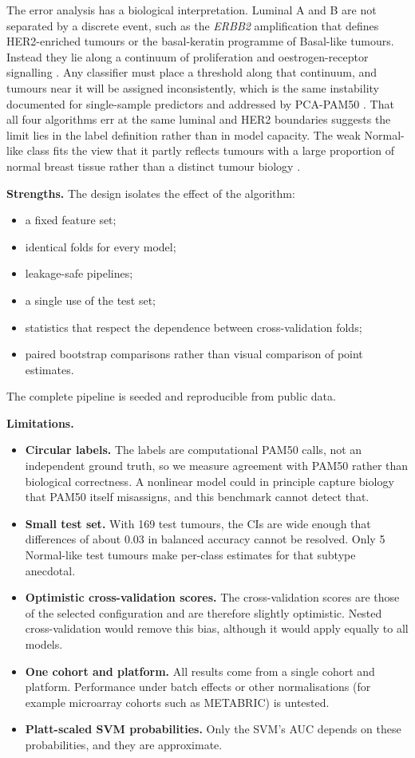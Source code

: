 \documentclass[10pt,twocolumn]{article}
\begin{document}
The error analysis has a biological interpretation. Luminal A and B are not separated by a discrete event, such as the \textit{ERBB2} amplification that defines HER2-enriched tumours or the basal-keratin programme of Basal-like tumours. Instead they lie along a continuum of proliferation and oestrogen-receptor signalling \citep{cheang2009,prat2011}. Any classifier must place a threshold along that continuum, and tumours near it will be assigned inconsistently, which is the same instability documented for single-sample predictors \citep{weigelt2010} and addressed by PCA-PAM50 \citep{paquet2019}. That all four algorithms err at the same luminal and HER2 boundaries suggests the limit lies in the label definition rather than in model capacity. The weak Normal-like class fits the view that it partly reflects tumours with a large proportion of normal breast tissue rather than a distinct tumour biology \citep{prat2011}.

\textbf{Strengths.} The design isolates the effect of the algorithm:
\begin{itemize}
\item a fixed feature set;
\item identical folds for every model;
\item leakage-safe pipelines;
\item a single use of the test set;
\item statistics that respect the dependence between cross-validation folds;
\item paired bootstrap comparisons rather than visual comparison of point estimates.
\end{itemize}
The complete pipeline is seeded and reproducible from public data.

\textbf{Limitations.}
\begin{itemize}
\item \textbf{Circular labels.} The labels are computational PAM50 calls, not an independent ground truth, so we measure agreement with PAM50 rather than biological correctness. A nonlinear model could in principle capture biology that PAM50 itself misassigns, and this benchmark cannot detect that.
\item \textbf{Small test set.} With 169 test tumours, the CIs are wide enough that differences of about 0.03 in balanced accuracy cannot be resolved. Only 5 Normal-like test tumours make per-class estimates for that subtype anecdotal.
\item \textbf{Optimistic cross-validation scores.} The cross-validation scores are those of the selected configuration and are therefore slightly optimistic. Nested cross-validation would remove this bias, although it would apply equally to all models.
\item \textbf{One cohort and platform.} All results come from a single cohort and platform. Performance under batch effects or other normalisations (for example microarray cohorts such as METABRIC) is untested.
\item \textbf{Platt-scaled SVM probabilities.} Only the SVM's AUC depends on these probabilities, and they are approximate.
\end{itemize}
\end{document}
